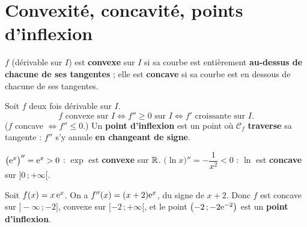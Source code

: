 \section{Convexité, concavité, points d'inflexion}

\begin{definition}
	$f$ (dérivable sur $I$) est \textbf{convexe} sur $I$ si sa courbe est
	entièrement \textbf{au-dessus de chacune de ses tangentes} ; elle est
	\textbf{concave} si sa courbe est en dessous de chacune de ses tangentes.
\end{definition}

\begin{theoreme}
	Soit $f$ deux fois dérivable sur $I$.
	\[
	f \text{ convexe sur } I
	\iff f'' \geq 0 \text{ sur } I
	\iff f' \text{ croissante sur } I.
	\]
	($f$ concave $\iff f''\leq 0$.) Un \textbf{point d'inflexion} est un point
	où $\mathcal C_f$ \textbf{traverse} sa tangente : $f''$ s'y annule \textbf{en
	changeant de signe}.
\end{theoreme}

\begin{center}
\end{center}

\begin{exemple}
	$\bigl(\mathrm{e}^{x}\bigr)''=\mathrm{e}^{x}>0$ : $\exp$ est \textbf{convexe} sur $\mathbb{R}$.
	$\bigl(\ln x\bigr)''=-\dfrac{1}{x^{2}}<0$ : $\ln$ est \textbf{concave} sur
	$]0\,;+\infty[$.
\end{exemple}

\begin{exemple}
	Soit $f(x)=x\,\mathrm{e}^{x}$. On a $f''(x)=(x+2)\mathrm{e}^{x}$, du signe de $x+2$.
	Donc $f$ est concave sur $]-\infty\,;-2]$, convexe sur $[-2\,;+\infty[$, et
	le point $\bigl(-2\,;-2\mathrm{e}^{-2}\bigr)$ est un \textbf{point d'inflexion}.
\end{exemple}

